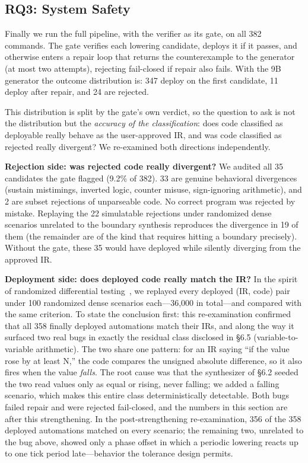 \documentclass[sigconf,nonacm,anonymous,review]{acmart}
\begin{document}
\subsection{RQ3: System Safety}

Finally we run the full pipeline, with the verifier as its gate, on all 382 commands. The gate verifies each lowering candidate, deploys it if it passes, and otherwise enters a repair loop that returns the counterexample to the generator (at most two attempts), rejecting fail-closed if repair also fails. With the 9B generator the outcome distribution is: 347 deploy on the first candidate, 11 deploy after repair, and 24 are rejected.

This distribution is split by the gate's own verdict, so the question to ask is not the distribution but the \emph{accuracy of the classification}: does code classified as deployable really behave as the user-approved IR, and was code classified as rejected really divergent? We re-examined both directions independently.

\textbf{Rejection side: was rejected code really divergent?} We audited all 35 candidates the gate flagged (9.2\% of 382). 33 are genuine behavioral divergences (sustain mistimings, inverted logic, counter misuse, sign-ignoring arithmetic), and 2 are subset rejections of unparseable code. No correct program was rejected by mistake. Replaying the 22 simulatable rejections under randomized dense scenarios unrelated to the boundary synthesis reproduces the divergence in 19 of them (the remainder are of the kind that requires hitting a boundary precisely). Without the gate, these 35 would have deployed while silently diverging from the approved IR.

\textbf{Deployment side: does deployed code really match the IR?} In the spirit of randomized differential testing~\cite{csmith}, we replayed every deployed (IR, code) pair under 100 randomized dense scenarios each—36,000 in total—and compared with the same criterion. To state the conclusion first: this re-examination confirmed that all 358 finally deployed automations match their IRs, and along the way it surfaced two real bugs in exactly the residual class disclosed in \S6.5 (variable-to-variable arithmetic). The two share one pattern: for an IR saying ``if the value rose by at least N,'' the code compares the unsigned absolute difference, so it also fires when the value \emph{falls}. The root cause was that the synthesizer of \S6.2 seeded the two read values only as equal or rising, never falling; we added a falling scenario, which makes this entire class deterministically detectable. Both bugs failed repair and were rejected fail-closed, and the numbers in this section are after this strengthening. In the post-strengthening re-examination, 356 of the 358 deployed automations matched on every scenario; the remaining two, unrelated to the bug above, showed only a phase offset in which a periodic lowering reacts up to one tick period late—behavior the tolerance design permits.
\end{document}

